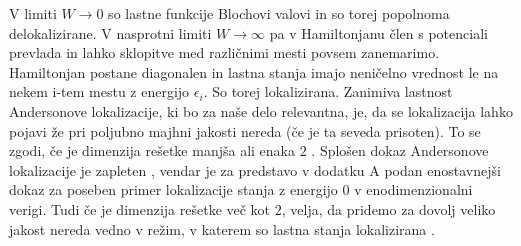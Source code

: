 V limiti $W \to 0$ so lastne funkcije Blochovi valovi in so torej popolnoma delokalizirane.
V nasprotni limiti $W \to \infty$ pa v Hamiltonjanu člen s potenciali prevlada in lahko sklopitve med različnimi mesti povsem zanemarimo. Hamiltonjan postane diagonalen in lastna stanja imajo neničelno vrednost le na nekem i-tem mestu z energijo $\epsilon_i$. So torej lokalizirana. 
Zanimiva lastnost Andersonove lokalizacije, ki bo za naše delo relevantna, je, da se lokalizacija lahko pojavi že pri poljubno majhni jakosti nereda (če je ta seveda prisoten). To se zgodi, če je dimenzija rešetke manjša ali enaka $2$ \cite{anderson}. Splošen dokaz Andersonove lokalizacije je zapleten \cite{anders}, vendar je za predstavo v dodatku A podan enostavnejši dokaz za poseben primer lokalizacije stanja z energijo $0$ v enodimenzionalni verigi.
Tudi če je dimenzija rešetke več kot $2$, velja, da pridemo za dovolj veliko jakost nereda vedno v režim, v katerem so lastna stanja lokalizirana \cite{anderson}.

